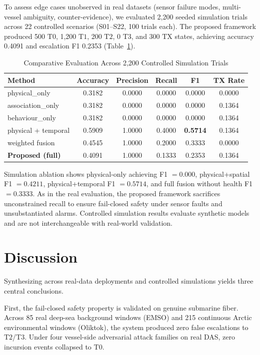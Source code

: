 \documentclass[conference]{IEEEtran}
\newcommand{\dstate}[1]{\ensuremath{\mathrm{#1}}}
\begin{document}
To assess edge cases unobserved in real datasets (sensor failure modes, multi-vessel
ambiguity, counter-evidence), we evaluated 2,200 seeded simulation trials across
22 controlled scenarios (S01--S22, 100 trials each). The proposed framework
produced 500 \dstate{T0}, 1{,}200 \dstate{T1}, 200 \dstate{T2}, 0 \dstate{T3},
and 300 \dstate{TX} states, achieving accuracy 0.4091 and escalation F1 0.2353
(Table~\ref{tab:sim-baselines}).

\begin{table}[!t]
\caption{Comparative Evaluation Across 2,200 Controlled Simulation Trials}
\label{tab:sim-baselines}
\centering
\footnotesize
\begin{tabular}{@{}lccccc@{}}
\toprule
Method & Accuracy & Precision & Recall & F1 & TX Rate \\
\midrule
physical\_only & 0.3182 & 0.0000 & 0.0000 & 0.0000 & 0.0000 \\
association\_only & 0.3182 & 0.0000 & 0.0000 & 0.0000 & 0.1364 \\
behaviour\_only & 0.3182 & 0.0000 & 0.0000 & 0.0000 & 0.1364 \\
physical + temporal & 0.5909 & 1.0000 & 0.4000 & \textbf{0.5714} & 0.1364 \\
weighted fusion & 0.4545 & 1.0000 & 0.2000 & 0.3333 & 0.0000 \\
\textbf{Proposed (full)} & 0.4091 & 1.0000 & 0.1333 & 0.2353 & 0.1364 \\
\bottomrule
\end{tabular}
\end{table}

Simulation ablation shows physical-only achieving F1 $= 0.000$, physical+spatial
F1 $= 0.4211$, physical+temporal F1 $= 0.5714$, and full fusion without health
F1 $= 0.3333$. As in the real evaluation, the proposed framework sacrifices
unconstrained recall to ensure fail-closed safety under sensor faults and
unsubstantiated alarms. Controlled simulation results evaluate synthetic models
and are not interchangeable with real-world validation.

\section{Discussion}

Synthesizing across real-data deployments and controlled simulations yields
three central conclusions.

First, the fail-closed safety property is validated on genuine submarine fiber.
Across 85 real deep-sea background windows (EMSO) and 215 continuous Arctic
environmental windows (Oliktok), the system produced zero false escalations to
\dstate{T2}/\dstate{T3}. Under four vessel-side adversarial attack families on
real DAS, zero incursion events collapsed to \dstate{T0}.
\end{document}
